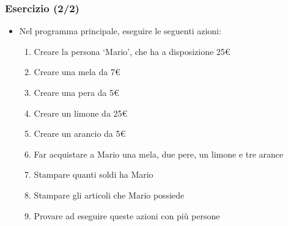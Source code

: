 \begin{exerciseframe}
    \frametitle{Esercizio (2/2)}

    \begin{itemize}
        \item Nel programma principale, eseguire le seguenti azioni:
        \begin{enumerate}
            \item Creare la persona `Mario', che ha a disposizione 25€
            \item Creare una mela da 7€
            \item Creare una pera da 5€
            \item Creare un limone da 25€
            \item Creare un arancio da 5€
            \item Far acquistare a Mario una mela, due pere, un limone e tre arance
            \item Stampare quanti soldi ha Mario
            \item Stampare gli articoli che Mario possiede
            \pause
            \bigskip
            \item Provare ad eseguire queste azioni con più persone
        \end{enumerate}
    \end{itemize}
\end{exerciseframe}

